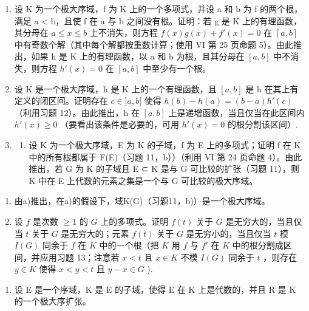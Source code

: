 \begin{enumerate}
\def\labelenumi{\arabic{enumi})}
\setcounter{enumi}{11}
\item
  设 K 为一个极大序域，f 为 K 上的一个多项式，并设 a 和 b 为 f 的两个根，满足 a \textless{} b，且使 f 在 a 与 b 之间没有根。证明：若 g 是 K 上的有理函数，其分母在 \(a \leqslant x \leqslant b\) 上不消失，则方程 \(f(x)g(x) + f'(x) = 0\) 在 \([a, b]\) 中有奇数个解（其中每个解都按重数计算；使用 VI 第 25 页命题 5）。由此推出，如果 h 是 K 上的有理函数，以 a 和 b 为根，且其分母在 \([a, b]\) 中不消失，则方程 \(h'(x) = 0\) 在 \([a, b]\) 中至少有一个根。
\item
  设 K 是一个极大序域，h 是 K 上的一个有理函数，且 \([a, b]\) 是 h 在其上有定义的闭区间。证明存在 \(c \in ]a, b[\) 使得 \(h(b) - h(a) = (b - a)h'(c)\) （利用习题 12）。由此推出，h 在 \([a, b]\) 上是递增函数，当且仅当在此区间内 \(h'(x) \geqslant 0\) （要看出该条件是必要的，可用 \(h'(x) = 0\) 的根分割该区间）.
\item
  \begin{enumerate}
  \def\labelenumii{\alph{enumii})}
  \tightlist
  \item
    设 K 为一个极大序域，E 为 K 的子域，f 为 E 上的多项式；证明 f 在 K 中的所有根都属于 F(E)（习题 11，b））（利用 VI 第 24 页命题 4）。由此推出，若 G 为 K 的子域且 E ⊂ K 是与 G 可比较的扩张（习题 11），则 K 中在 E 上代数的元素之集是一个与 G 可比较的极大序域。
  \end{enumerate}
\end{enumerate}

\begin{enumerate}
\def\labelenumi{\alph{enumi})}
\setcounter{enumi}{1}
\item
  由a)推出，在a)的假设下，域K(G)（习题11，b)）是一个极大序域。
\item
  设 \(f\) 是次数 \(\geqslant 1\) 的 \(G\) 上的多项式。证明 \(f(t)\) 关于 \(G\) 是无穷大的，当且仅当 \(t\) 关于 \(G\) 是无穷大的；元素 \(f(t)\) 关于 \(G\) 是无穷小的，当且仅当 \(t\) 模 \(I(G)\) 同余于 \(f\) 在 \(K\) 中的一个根（把 \(K\) 用 \(f\) 与 \(f'\) 在 \(K\) 中的根分割成区间，并应用习题 13；注意若 \(x < t\) 且 \(x \in K\) 不模 \(I(G)\) 同余于 \(t\) ，则存在 \(y \in K\) 使得 \(x < y < t\) 且 \(y - x \in G\) ).
\end{enumerate}

\begin{enumerate}
\def\labelenumi{\arabic{enumi})}
\setcounter{enumi}{14}
\tightlist
\item
  设 E 是一个序域，K 是 E 的子域，使得 E 在 K 上是代数的，并且 R 是 K 的一个极大序扩张。
\end{enumerate}

